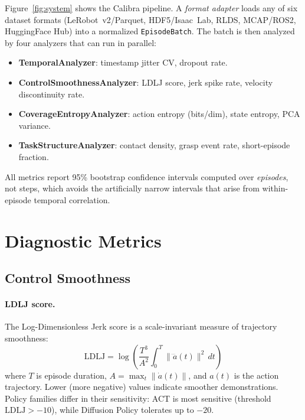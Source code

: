 \documentclass[10pt,twocolumn]{article}
\begin{document}
Figure~\ref{fig:system} shows the Calibra pipeline.
A \emph{format adapter} loads any of six dataset formats
(LeRobot~v2/Parquet, HDF5/Isaac~Lab, RLDS, MCAP/ROS2, HuggingFace Hub) into
a normalized \texttt{EpisodeBatch}. The batch is then analyzed by four
analyzers that can run in parallel:

\begin{itemize}[nosep]
  \item \textbf{TemporalAnalyzer}: timestamp jitter CV, dropout rate.
  \item \textbf{ControlSmoothnessAnalyzer}: LDLJ score, jerk spike rate, velocity
    discontinuity rate.
  \item \textbf{CoverageEntropyAnalyzer}: action entropy (bits/dim), state entropy,
    PCA variance.
  \item \textbf{TaskStructureAnalyzer}: contact density, grasp event rate,
    short-episode fraction.
\end{itemize}

All metrics report 95\% bootstrap confidence intervals computed over
\emph{episodes}, not steps, which avoids the artificially narrow intervals
that arise from within-episode temporal correlation.

\section{Diagnostic Metrics}
\label{sec:metrics}

\subsection{Control Smoothness}
\paragraph{LDLJ score.}
The Log-Dimensionless Jerk score \citep{balasubramanian2012} is a
scale-invariant measure of trajectory smoothness:
\begin{equation}
  \mathrm{LDLJ} = \log\!\left(
    \frac{T^3}{A^2} \int_0^T \|\dddot{a}(t)\|^2\, dt
  \right)
  \label{eq:ldlj}
\end{equation}
where $T$ is episode duration, $A = \max_t \|\dot{a}(t)\|$, and $a(t)$
is the action trajectory.
Lower (more negative) values indicate smoother demonstrations.
Policy families differ in their sensitivity: ACT is most sensitive (threshold
$\text{LDLJ} > -10$), while Diffusion Policy tolerates up to $-20$.
\end{document}
